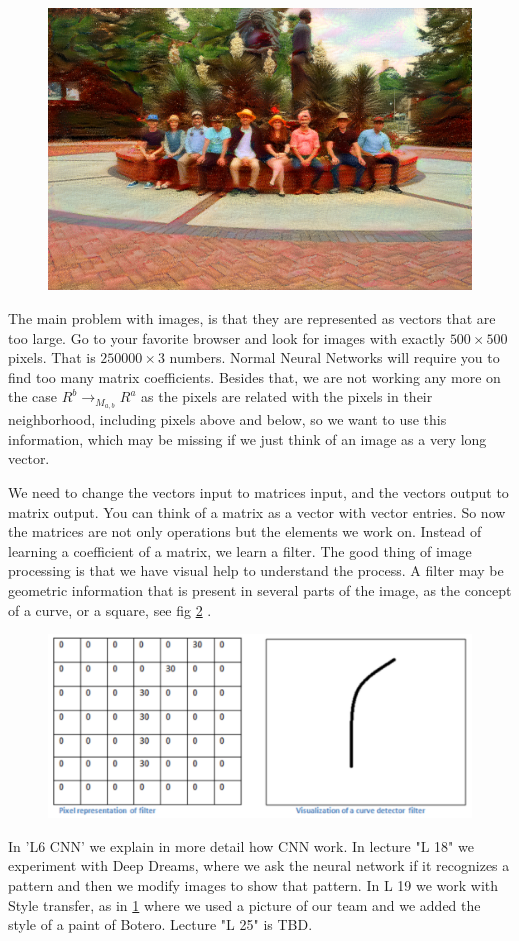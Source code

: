 \documentclass[11pt,letterpaper]{report}
\begin{document}
	
	\begin{figure}[h!]
		\centering
		\includegraphics[width=0.45\linewidth]{figures/botero.png}
		\caption{}
		\label{fig:botero}
	\end{figure} 	
	
	The main problem with images, is that they are represented as vectors that are too large. Go to your favorite browser and look for images with exactly  $500\times500$ pixels. That is $250000\times3$ numbers. Normal Neural Networks will require you to find too many matrix coefficients. Besides that, we are not working any more on the case $R^b\rightarrow_{ M_{a,b}} R^a$ as the pixels are related with the pixels in their neighborhood, including pixels above and below, so we want to use this information, which may be missing if we just think of an image as a very long vector. 
	 
	
	We need to change the vectors input to matrices input,  and the vectors output to matrix output. You can think of a matrix as a vector with vector entries.  So now the matrices are not only operations but the elements we work on.
	Instead of learning a coefficient of a matrix, we learn a filter. The good thing of image processing is that we have visual help to understand the process. A filter may be geometric information that is present in several parts of the image, as the concept of a curve, or a square, see fig \ref{fig:filter} .  
	
	\begin{figure}[h!]
		\centering
		\includegraphics[width=0.45\linewidth]{figures/filter.png}
		\caption{}
		\label{fig:filter}
	\end{figure} 	

	
	In 'L6 CNN' we explain in more detail how CNN work. In lecture "L 18" we experiment with Deep Dreams, where we ask the neural network if it recognizes a pattern and then we modify images to show that pattern. In L 19 we work with Style transfer, as in \ref{fig:botero} where we used a picture of our team and we added the style of a paint of Botero. Lecture "L 25" is TBD.
	
\end{document}
